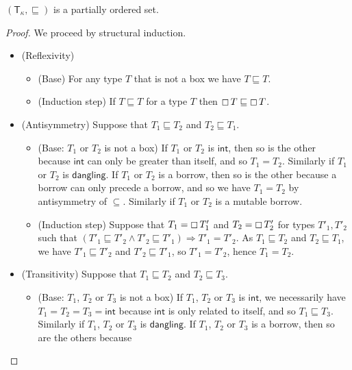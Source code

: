 \begin{lemma}
  \label{lemma:partial-order-types}
  $(\mathsf{T}_\kappa,\sqsubseteq)$ is a partially ordered set.
\end{lemma}
\begin{proof}
  We proceed by structural induction.
  \begin{itemize}
    \item (Reflexivity)
    \begin{itemize}
      \item (Base) For any type $T$ that is not a box we have
      $T\sqsubseteq T$.
      \item (Induction step) If $T\sqsubseteq T$ for a type $T$ then
      $\boxempty\,{T}\sqsubseteq \boxempty\,{T}$.
    \end{itemize}
    \item (Antisymmetry) Suppose that $T_1 \sqsubseteq T_2$ and
    $T_2 \sqsubseteq T_1$.
    \begin{itemize}
      \item (Base: $T_1$ or $T_2$ is not a box)
      If $T_1$ or $T_2$ is $\mathsf{int}$, then so is the other
      because $\mathsf{int}$ can only be greater than itself, and so $T_1 = T_2$.
      Similarly if $T_1$ or $T_2$ is $\mathsf{dangling}$.
      If $T_1$ or $T_2$ is a borrow, then so is the other because
      a borrow can only precede a borrow, and so we have $T_1 = T_2$
      by antisymmetry of $\subseteq$.
      Similarly if $T_1$ or $T_2$ is a mutable borrow.
      \item (Induction step) Suppose that $T_1=\boxempty\,{T'_1}$ and
      $T_2=\boxempty\,{T'_2}$ for types $T'_1,T'_2$ such that
      $(T'_1 \sqsubseteq T'_2 \land T'_2 \sqsubseteq T'_1) \Rightarrow T'_1 = T'_2$.
      As $T_1 \sqsubseteq T_2$ and $T_2 \sqsubseteq T_1$, we have
      $T'_1 \sqsubseteq T'_2$ and $T'_2 \sqsubseteq T'_1$, so
      $T'_1 = T'_2$, hence $T_1 = T_2$.
    \end{itemize}
    \item (Transitivity) Suppose that $T_1 \sqsubseteq T_2$ and $T_2 \sqsubseteq T_3$.
    \begin{itemize}
      \item (Base: $T_1$, $T_2$ or $T_3$ is not a box)
      If $T_1$, $T_2$ or $T_3$ is $\mathsf{int}$, we necessarily have
      $T_1=T_2=T_3=\mathsf{int}$ because $\mathsf{int}$ is only related to
      itself, and so $T_1\sqsubseteq T_3$. Similarly if
      $T_1$, $T_2$ or $T_3$ is $\mathsf{dangling}$.
      If $T_1$, $T_2$ or $T_3$ is a borrow, then so are the others because

\end{itemize}
\end{itemize}
\end{proof}
